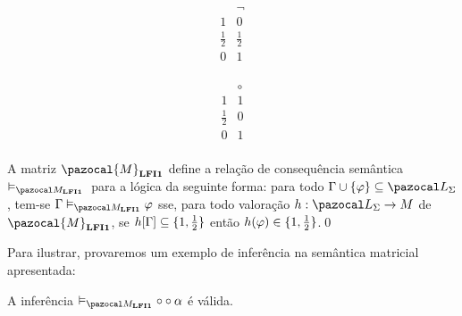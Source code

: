 \begin{definicao}
            \vspace{0.5cm}

            \begin{minipage}{0.4\textwidth}
                \[
                    \begin{array}{c|c}%
                                    & \neg        \\
                        \hline%
                        1           & 0           \\
                        \frac{1}{2} & \frac{1}{2} \\
                        0           & 1           \\
                    \end{array}
                \]
            \end{minipage}
            \begin{minipage}{0.3\textwidth}
                \[
                    \begin{array}{c|c}%
                                    & \circ   \\
                        \hline%
                        1           & 1         \\
                        \frac{1}{2} & 0         \\
                        0           & 1         \\
                    \end{array}
                \]
            \end{minipage}

            \vspace{\baselineskip}

            \noindent
            A matriz $\pazocal{M}_{\lfium{}}$ define a relação de consequência semântica $\conmat{}$ para a lógica \lfium{} da seguinte forma: para todo $\Gamma \cup \{\phi\} \subseteq \ling{}$, tem-se $\Gamma \conmat \phi$ sse, para todo valoração $h : \ling{} \to M$ de $\pazocal{M}_{\lfium{}}$, se $h[\Gamma] \subseteq \{1, \frac{1}{2}{}\}$ então $h(\varphi) \in \{1, \frac{1}{2}{}\}$.\qed{}
        \end{definicao}

        Para ilustrar, provaremos um exemplo de inferência na semântica matricial apresentada:

        \begin{exemplo}\label{ex:2}
            A inferência $ \conmat \circ \circ \alpha$ é válida.
        \end{exemplo}

